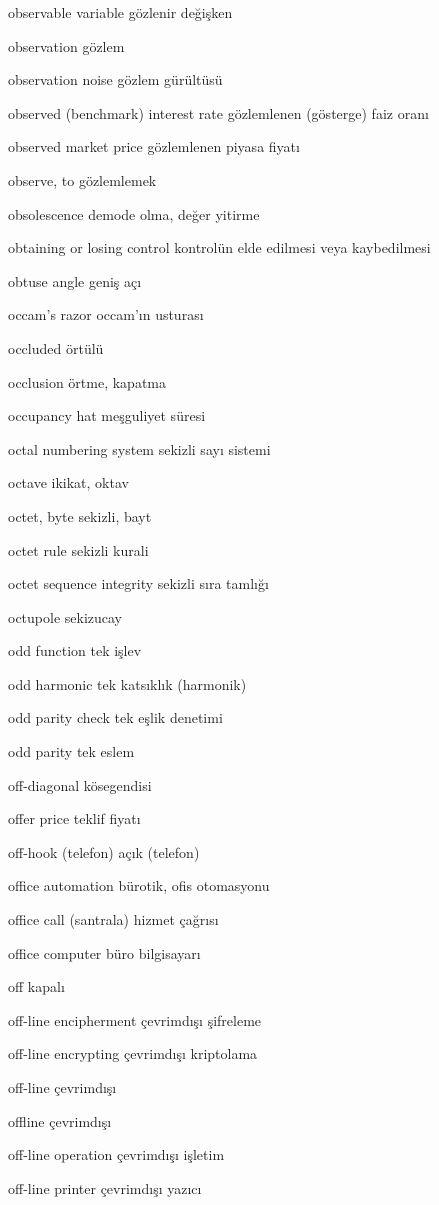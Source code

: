 \documentclass[12pt,fleqn]{article}\usepackage{../../common}
\begin{document}
observable variable gözlenir değişken

observation gözlem

observation noise gözlem gürültüsü

observed (benchmark) interest rate gözlemlenen (gösterge) faiz oranı

observed market price gözlemlenen piyasa fiyatı

observe, to gözlemlemek

obsolescence demode olma, değer yitirme

obtaining or losing control kontrolün elde edilmesi veya kaybedilmesi

obtuse angle geniş açı

occam's razor occam'ın usturası

occluded örtülü

occlusion örtme, kapatma

occupancy hat meşguliyet süresi

octal numbering system sekizli sayı sistemi

octave ikikat, oktav

octet, byte sekizli, bayt

octet rule sekizli kurali

octet sequence integrity sekizli sıra tamlığı

octupole sekizucay

odd function tek işlev

odd harmonic tek katsıklık (harmonik)

odd parity check tek eşlik denetimi

odd parity tek eslem

off-diagonal kösegendisi

offer price teklif fiyatı

off-hook (telefon) açık (telefon)

office automation bürotik, ofis otomasyonu

office call (santrala) hizmet çağrısı

office computer büro bilgisayarı

off kapalı

off-line encipherment çevrimdışı şifreleme

off-line encrypting çevrimdışı kriptolama

off-line çevrimdışı

offline çevrimdışı

off-line operation çevrimdışı işletim

off-line printer çevrimdışı yazıcı
\end{document}
